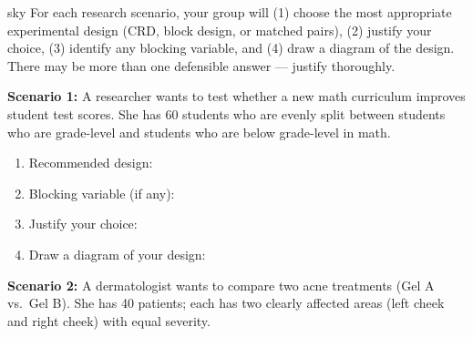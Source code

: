 \documentclass[10pt]{article}
\begin{document}
\namepartnerperiod

\vspace{0.1in}

\begin{scenariobox}[Context]{sky}
\small
For each research scenario, your group will (1) choose the most appropriate
experimental design (CRD, block design, or matched pairs), (2) justify your
choice, (3) identify any blocking variable, and (4) draw a diagram of the design.
There may be more than one defensible answer --- justify thoroughly.
\end{scenariobox}

\vspace{0.1in}

\textbf{Scenario 1:} A researcher wants to test whether a new math curriculum improves
student test scores. She has 60 students who are evenly split between students who
are grade-level and students who are below grade-level in math.

\begin{practicebox}
\small
\begin{enumerate}[leftmargin=1.5em, itemsep=8pt]
  \item Recommended design: 
  \item Blocking variable (if any): 
  \item Justify your choice: \\
  \item {}Draw a diagram of your design:
  \vspace{1.4in}
\end{enumerate}
\end{practicebox}

\vspace{0.1in}

\textbf{Scenario 2:} A dermatologist wants to compare two acne treatments (Gel A
vs.\ Gel B). She has 40 patients; each has two clearly affected areas (left cheek
and right cheek) with equal severity.
\end{document}

